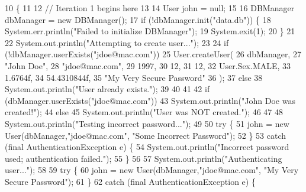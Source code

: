 \begin{DoxyCode}
10                                            \{
11 
12         \textcolor{comment}{// Iteration 1 begins here}
13 
14         User john = null;
15 
16         DBManager dbManager = \textcolor{keyword}{new} DBManager();
17         \textcolor{keywordflow}{if} (!dbManager.init(\textcolor{stringliteral}{"data.db"})) \{
18             System.err.println(\textcolor{stringliteral}{"Failed to initialize DBManager"});
19             System.exit(1);
20         \}
21 
22         System.out.println(\textcolor{stringliteral}{"Attempting to create user..."});
23 
24         \textcolor{keywordflow}{if} (!dbManager.userExists(\textcolor{stringliteral}{"jdoe@mac.com"}))
25             User.createUser(
26                     dbManager,
27                     \textcolor{stringliteral}{"John Doe"},
28                     \textcolor{stringliteral}{"jdoe@mac.com"},
29                     1997,
30                     12,
31                     12,
32                     User.Sex.MALE,
33                     1.6764f,
34                     54.4310844f,
35                     \textcolor{stringliteral}{"My Very Secure Password"}
36             );
37         \textcolor{keywordflow}{else}
38             System.out.println(\textcolor{stringliteral}{"User already exists."});
39 
40 
41 
42         \textcolor{keywordflow}{if} (dbManager.userExists(\textcolor{stringliteral}{"jdoe@mac.com"}))
43             System.out.println(\textcolor{stringliteral}{"John Doe was created!"});
44         \textcolor{keywordflow}{else}
45             System.out.println(\textcolor{stringliteral}{"User was NOT created."});
46 
47 
48         System.out.println(\textcolor{stringliteral}{"Testing incorrect password..."});
49 
50         \textcolor{keywordflow}{try} \{
51             john = \textcolor{keyword}{new} User(dbManager,\textcolor{stringliteral}{"jdoe@mac.com"}, \textcolor{stringliteral}{"Some Incorrect Password"});
52         \}
53         \textcolor{keywordflow}{catch} (\textcolor{keyword}{final} AuthenticationException e) \{
54             System.out.println(\textcolor{stringliteral}{"Incorrect password used; authentication failed."});
55         \}
56 
57         System.out.println(\textcolor{stringliteral}{"Authenticating user..."});
58 
59         \textcolor{keywordflow}{try} \{
60             john = \textcolor{keyword}{new} User(dbManager,\textcolor{stringliteral}{"jdoe@mac.com"}, \textcolor{stringliteral}{"My Very Secure Password"});
61         \}
62         \textcolor{keywordflow}{catch} (\textcolor{keyword}{final} AuthenticationException e) \{

\end{DoxyCode}
